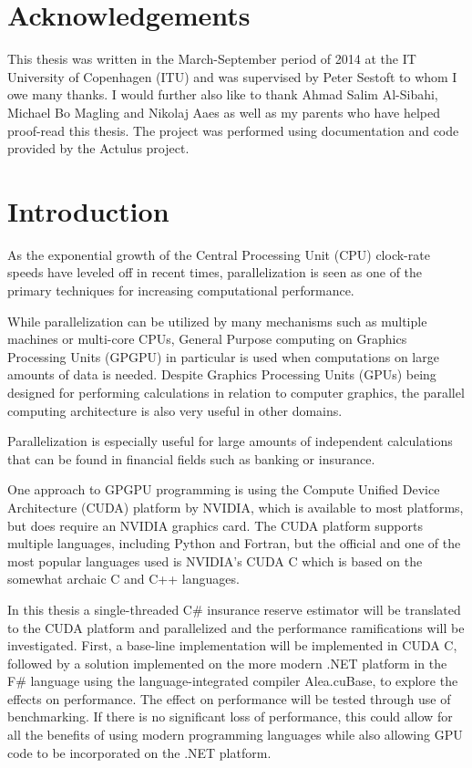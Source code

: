 \section*{Acknowledgements}
This thesis was written in the March-September period of 2014 at the IT University of Copenhagen (ITU) and was supervised by Peter Sestoft to whom I owe many thanks. 
I would further also like to thank Ahmad Salim Al-Sibahi, Michael Bo Magling and Nikolaj Aaes as well as my parents who have helped proof-read this thesis.
The project was performed using documentation and code provided by the Actulus project\cite{actulus}.

\section{Introduction}
As the exponential growth of the Central Processing Unit (CPU) clock-rate speeds have leveled off in recent times\cite{ross2008cpu}, parallelization is seen as one of the primary techniques for increasing computational performance. 

While parallelization can be utilized by many mechanisms such as multiple machines or multi-core CPUs, General Purpose computing on Graphics Processing Units (GPGPU) in particular is used when computations on large amounts of data is needed. 
Despite Graphics Processing Units (GPUs) being designed for performing calculations in relation to computer graphics, the parallel computing architecture is also very useful in other domains.

Parallelization is especially useful for large amounts of independent calculations that can be found in financial fields such as banking or insurance.

One approach to GPGPU programming is using the Compute Unified Device Architecture (CUDA) platform by NVIDIA, which is available to most platforms, but does require an NVIDIA graphics card.
The CUDA platform supports multiple languages, including Python and Fortran, but the official and one of the most popular languages used is NVIDIA's CUDA C which is based on the somewhat archaic C and C++ languages.

In this thesis a single-threaded C\# insurance reserve estimator will be translated to the CUDA platform and parallelized and the performance ramifications will be investigated.
First, a base-line implementation will be implemented in CUDA C, followed by a solution implemented on the more modern .NET platform in the F\# language using the language-integrated compiler Alea.cuBase, to explore the effects on performance.
The effect on performance will be tested through use of benchmarking.
If there is no significant loss of performance, this could allow for all the benefits of using modern programming languages while also allowing GPU code to be incorporated on the .NET platform.

